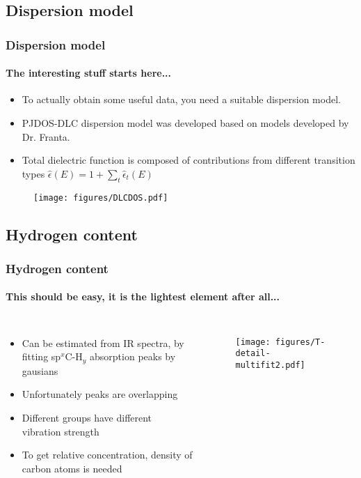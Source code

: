 \documentclass{beamer}
\begin{document}
\subsection{Dispersion model}
\begin{frame}
    \frametitle{Dispersion model}
	\framesubtitle{The interesting stuff starts here...}
	\vspace{-0.2cm}
   \begin{itemize}
	\item To actually obtain some useful data, you need a suitable dispersion model.
	\item PJDOS-DLC dispersion model was developed based on models developed by Dr. Franta. 
	\item Total dielectric function is composed of contributions from different transition types $\hat{\epsilon}(E) = 1 + \sum_t \hat{\epsilon}_t(E)$
   \end{itemize} 
 
   \begin{figure}
   \begin{center}
	\texttt{[image: figures/DLCDOS.pdf]}
   \end{center}
	\end{figure}
   
\end{frame}

\subsection{Hydrogen content}
\begin{frame}
    \frametitle{Hydrogen content}
   \framesubtitle{This should be easy, it is the lightest element after all...}
	\begin{columns}[c]
	\begin{itemize}
	\item Can be estimated from IR spectra, by fitting sp$^x$C-H$_y$ absorption peaks by gausians
   \item Unfortunately peaks are overlapping
   \item Different groups have different vibration strength
   \item To get relative concentration, density of carbon atoms is needed
   \end{itemize}

	\begin{figure}
	\texttt{[image: figures/T-detail-multifit2.pdf]}
	\end{figure}

   \end{columns}

\end{frame}
\end{document}
